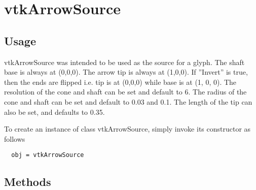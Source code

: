 \section{vtkArrowSource}

\subsection{Usage}

 vtkArrowSource was intended to be used as the source for a glyph.
 The shaft base is always at (0,0,0). The arrow tip is always at (1,0,0). If
 ''Invert'' is true, then the ends are flipped i.e. tip is at (0,0,0) while
 base is at (1, 0, 0).
 The resolution of the cone and shaft can be set and default to 6.
 The radius of the cone and shaft can be set and default to 0.03 and 0.1.
 The length of the tip can also be set, and defaults to 0.35.

To create an instance of class vtkArrowSource, simply
invoke its constructor as follows
\begin{verbatim}
  obj = vtkArrowSource
\end{verbatim}
\subsection{Methods}

